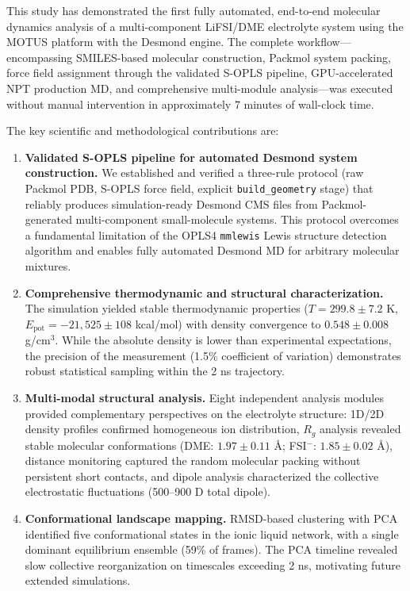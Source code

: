 \documentclass[twocolumn,10pt]{article}
\begin{document}
This study has demonstrated the first fully automated, end-to-end molecular dynamics analysis of a multi-component LiFSI/DME electrolyte system using the MOTUS platform with the Desmond engine. The complete workflow---encompassing SMILES-based molecular construction, Packmol system packing, force field assignment through the validated S-OPLS pipeline, GPU-accelerated NPT production MD, and comprehensive multi-module analysis---was executed without manual intervention in approximately 7 minutes of wall-clock time.

The key scientific and methodological contributions are:

\begin{enumerate}[nosep, label=\textbf{\arabic*.}]
    \item \textbf{Validated S-OPLS pipeline for automated Desmond system construction.} We established and verified a three-rule protocol (raw Packmol PDB, S-OPLS force field, explicit \texttt{build\_geometry} stage) that reliably produces simulation-ready Desmond CMS files from Packmol-generated multi-component small-molecule systems. This protocol overcomes a fundamental limitation of the OPLS4 \texttt{mmlewis} Lewis structure detection algorithm and enables fully automated Desmond MD for arbitrary molecular mixtures.
    \item \textbf{Comprehensive thermodynamic and structural characterization.} The simulation yielded stable thermodynamic properties ($T = 299.8 \pm 7.2$ K, $E_{\text{pot}} = -21{,}525 \pm 108$ kcal/mol) with density convergence to $0.548 \pm 0.008$ g/cm$^3$. While the absolute density is lower than experimental expectations, the precision of the measurement (1.5\% coefficient of variation) demonstrates robust statistical sampling within the 2 ns trajectory.
    \item \textbf{Multi-modal structural analysis.} Eight independent analysis modules provided complementary perspectives on the electrolyte structure: 1D/2D density profiles confirmed homogeneous ion distribution, $R_g$ analysis revealed stable molecular conformations (DME: $1.97 \pm 0.11$ \AA; FSI$^-$: $1.85 \pm 0.02$ \AA), distance monitoring captured the random molecular packing without persistent short contacts, and dipole analysis characterized the collective electrostatic fluctuations (500--900 D total dipole).
    \item \textbf{Conformational landscape mapping.} RMSD-based clustering with PCA identified five conformational states in the ionic liquid network, with a single dominant equilibrium ensemble (59\% of frames). The PCA timeline revealed slow collective reorganization on timescales exceeding 2 ns, motivating future extended simulations.

\end{enumerate}
\end{document}
